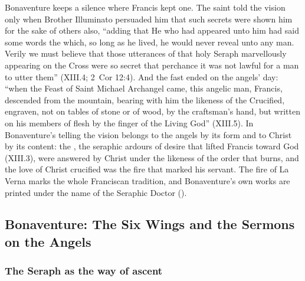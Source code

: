 Bonaventure keeps a silence where Francis kept one. The saint told the
vision only when Brother Illuminato persuaded him that such secrets were
shown him for the sake of others also, ``adding that He who had
appeared unto him had said some words the which, so long as he lived, he
would never reveal unto any man. Verily we must believe that those
utterances of that holy Seraph marvellously appearing on the Cross were so
secret that perchance it was not lawful for a man to utter them'' (XIII.4;
2~Cor 12:4). And the fast ended on the angels' day: ``when the Feast of
Saint Michael Archangel came, this angelic man, Francis, descended from the
mountain, bearing with him the likeness of the Crucified, engraven, not on
tables of stone or of wood, by the craftsman's hand, but written on his
members of flesh by the finger of the Living God'' (XIII.5). In
Bonaventure's telling the vision belongs to the angels by its form and to
Christ by its content: the , the
seraphic ardours of desire that lifted Francis toward God (XIII.3), were
answered by Christ under the likeness of the order that burns, and the love
of Christ crucified was the fire that marked his servant. The fire of La Verna marks the whole Franciscan tradition, and
Bonaventure's own works are printed under the name of the Seraphic Doctor
().

\sectionguard\subsection{Bonaventure: The Six Wings and the Sermons on the
Angels}\label{sec:sa-bonaventure}

\subsubsection{The Seraph as the way of ascent}

